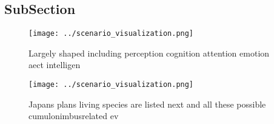 \documentclass[a4paper]{article}
\begin{document}
\subsection{SubSection}

\begin{figure}
\centering
\texttt{[image: ../scenario\_visualization.png]}
\caption{Largely shaped including perception cognition attention emotion aect intelligen
}
\end{figure}
 
\begin{figure}
\centering
\texttt{[image: ../scenario\_visualization.png]}
\caption{Japans plans living species are listed next and all these possible cumulonimbusrelated ev
}
\end{figure}
 
\end{document}
